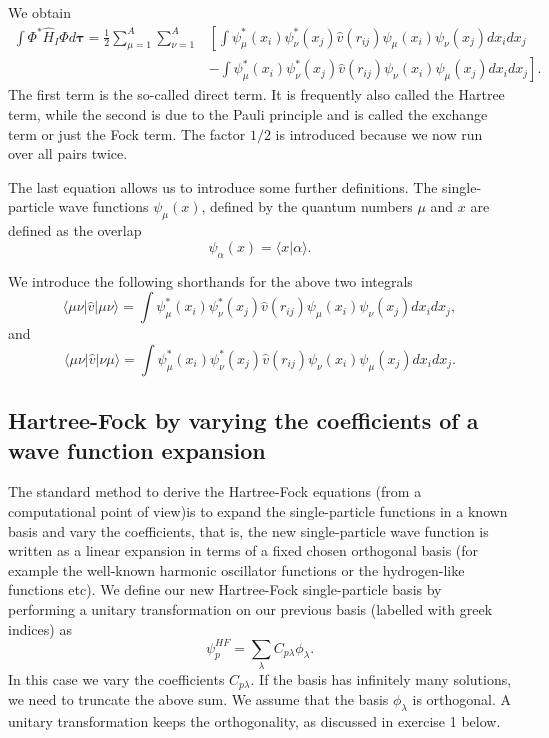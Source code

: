 \documentclass[%
twoside,                 %
final,                   %
10pt]{article}
\begin{document}
We obtain
\begin{equation}
\begin{split}
  \int \Phi^*\hat{H}_I\Phi d\mathbf{\tau} 
  = \frac{1}{2}\sum_{\mu=1}^A\sum_{\nu=1}^A
    &\left[ \int \psi_{\mu}^*(x_i)\psi_{\nu}^*(x_j)\hat{v}(r_{ij})\psi_{\mu}(x_i)\psi_{\nu}(x_j)
    dx_idx_j \right.\\
  &\left.
  - \int \psi_{\mu}^*(x_i)\psi_{\nu}^*(x_j)
  \hat{v}(r_{ij})\psi_{\nu}(x_i)\psi_{\mu}(x_j)
  dx_idx_j
  \right]. \label{H2Expectation}
\end{split}
\end{equation}
The first term is the so-called direct term. It is frequently also called the  Hartree term, 
while the second is due to the Pauli principle and is called
the exchange term or just the Fock term.
The factor  $1/2$ is introduced because we now run over
all pairs twice. 




The last equation allows us to  introduce some further definitions.  
The single-particle wave functions $\psi_{\mu}(x)$, defined by the quantum numbers $\mu$ and $x$
are defined as the overlap 
\[
   \psi_{\alpha}(x)  = \langle x | \alpha \rangle .
\]




We introduce the following shorthands for the above two integrals
\[
\langle \mu\nu|\hat{v}|\mu\nu\rangle =  \int \psi_{\mu}^*(x_i)\psi_{\nu}^*(x_j)\hat{v}(r_{ij})\psi_{\mu}(x_i)\psi_{\nu}(x_j)
    dx_idx_j,
\]
and
\[
\langle \mu\nu|\hat{v}|\nu\mu\rangle = \int \psi_{\mu}^*(x_i)\psi_{\nu}^*(x_j)
  \hat{v}(r_{ij})\psi_{\nu}(x_i)\psi_{\mu}(x_j)
  dx_idx_j.  
\]





\subsection*{Hartree-Fock by varying the coefficients of a wave function expansion}

The standard method to derive the Hartree-Fock equations (from a computational point of view)is to expand the single-particle functions in a known basis  and vary the coefficients, 
that is, the new single-particle wave function is written as a linear expansion
in terms of a fixed chosen orthogonal basis (for example the well-known harmonic oscillator functions or the hydrogen-like functions etc).
We define our new Hartree-Fock single-particle basis by performing a unitary transformation 
on our previous basis (labelled with greek indices) as
\begin{equation}
\psi_p^{HF}  = \sum_{\lambda} C_{p\lambda}\phi_{\lambda}. \label{eq:newbasis}
\end{equation}
In this case we vary the coefficients $C_{p\lambda}$. If the basis has infinitely many solutions, we need
to truncate the above sum.  We assume that the basis $\phi_{\lambda}$ is orthogonal. A unitary transformation keeps the orthogonality, as discussed in exercise 1 below.  
\end{document}
